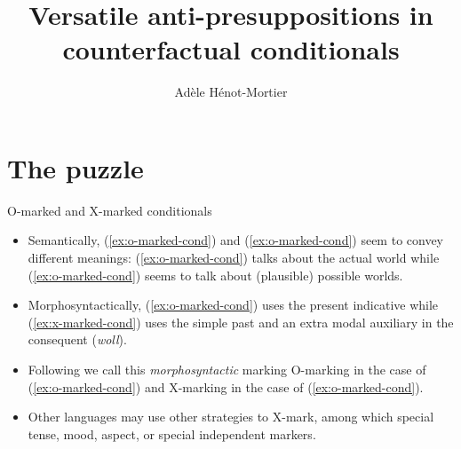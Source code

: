 \documentclass[10pt]{beamer}
\title{Versatile anti-presuppositions in counterfactual conditionals}
\date{}
\author{Adèle Hénot-Mortier}
\institute{Massachusetts Institute of Technology}
\begin{document}
\maketitle

\section[The puzzle]{The puzzle}
\begin{frame}{O-marked and X-marked conditionals}
	\begin{exe}
		\ex
		\begin{xlist}
			\label{ex:o-marked-cond}
			\label{ex:x-marked-cond}
		\end{xlist}
	\end{exe}
	\begin{itemize}
		\item Semantically, (\ref{ex:o-marked-cond}) and (\ref{ex:o-marked-cond}) seem to convey different meanings: (\ref{ex:o-marked-cond}) talks about the actual world while (\ref{ex:o-marked-cond}) seems to talk about (plausible) possible worlds.
		\item Morphosyntactically, (\ref{ex:o-marked-cond}) uses the present indicative while (\ref{ex:x-marked-cond}) uses the simple past and an extra modal auxiliary in the consequent (\textit{woll}).
		\item Following we call this \textit{morphosyntactic} marking O-marking in the case of (\ref{ex:o-marked-cond}) and X-marking in the case of (\ref{ex:o-marked-cond}).
		\item Other languages may use other strategies to X-mark, among which special tense, mood, aspect, or special independent markers.
	\end{itemize}
\end{frame}
\end{document}
